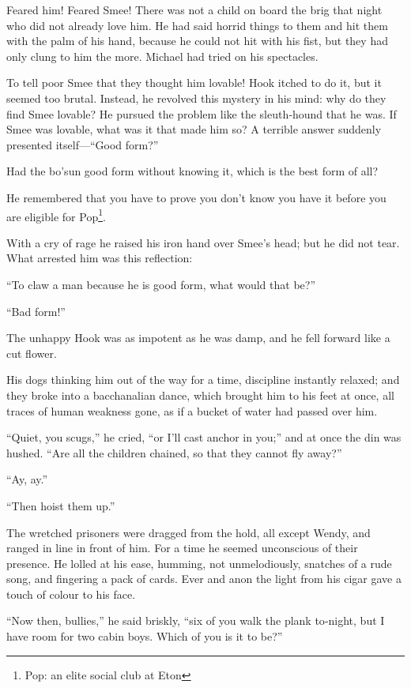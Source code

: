 Feared him!
Feared Smee!
There was not a child on board the brig that night who did not already love him.
He had said horrid things to them and hit them with the palm of his hand, because he could not hit with his fist,
but they had only clung to him the more.
Michael had tried on his spectacles.

To tell poor Smee that they thought him lovable!
Hook itched to do it, but it seemed too brutal.
Instead, he revolved this mystery in his mind:
why do they find Smee lovable?
He pursued the problem like the sleuth‐hound that he was.
If Smee was lovable, what was it that made him so?
A terrible answer suddenly presented itself—“Good form?”

Had the bo’sun good form without knowing it, which is the best form of all?

He remembered that you have to prove you don’t know you have it
before you are eligible for Pop\footnote{Pop: an elite social club at Eton}.

With a cry of rage he raised his iron hand over Smee’s head;
but he did not tear.
What arrested him was this reflection:

“To claw a man because he is good form, what would that be?”

“Bad form!”

The unhappy Hook was as impotent as he was damp, and he fell forward like a cut flower.

His dogs thinking him out of the way for a time, discipline instantly relaxed;
and they broke into a bacchanalian dance,
which brought him to his feet at once, all traces of human weakness gone,
as if a bucket of water had passed over him.

“Quiet, you scugs,” he cried, “or I’ll cast anchor in you;”
and at once the din was hushed.
“Are all the children chained, so that they cannot fly away?”

“Ay, ay.”

“Then hoist them up.”

The wretched prisoners were dragged from the hold, all except Wendy,
and ranged in line in front of him.
For a time he seemed unconscious of their presence.
He lolled at his ease, humming, not unmelodiously, snatches of a rude song,
and fingering a pack of cards.
Ever and anon the light from his cigar gave a touch of colour to his face.

“Now then, bullies,” he said briskly, “six of you walk the plank to‐night,
but I have room for two cabin boys.
Which of you is it to be?”


